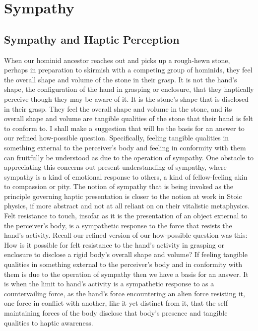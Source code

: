\chapter{Sympathy} %
\label{cha:sympathy}

\section{Sympathy and Haptic Perception} %
\label{sec:sympathy_and_haptic_perception}

When our hominid ancestor reaches out and picks up a rough-hewn stone, perhaps in preparation to skirmish with a competing group of hominids, they feel the overall shape and volume of the stone in their grasp. It is not the hand's shape, the configuration of the hand in grasping or enclosure, that they haptically perceive though they may be aware of it. It is the stone's shape that is disclosed in their grasp. They feel the overall shape and volume in the stone, and its overall shape and volume are tangible qualities of the stone that their hand is felt to conform to. I shall make a suggestion that will be the basis for an answer to our refined how-possible question. Specifically, feeling tangible qualities in something external to the perceiver's body and feeling in conformity with them can fruitfully be understood as due to the operation of sympathy. One obstacle to appreciating this concerns out present understanding of sympathy, where sympathy is a kind of emotional response to others, a kind of fellow-feeling akin to compassion or pity. The notion of sympathy that is being invoked as the principle governing haptic presentation is closer to the notion at work in Stoic physics, if more abstract and not at all reliant on on their vitalistic metaphysics. Felt resistance to touch, insofar as it is the presentation of an object external to the perceiver's body, is a sympathetic response to the force that resists the hand's activity. Recall our refined version of our how-possible question was this: How is it possible for felt resistance to the hand's activity in grasping or enclosure to disclose a rigid body's overall shape and volume? If feeling tangible qualities in something external to the perceiver's body and in conformity with them is due to the operation of sympathy then we have a basis for an answer. It is when the limit to hand's activity is a sympathetic response to as a countervailing force, as the hand's force encountering an alien force resisting it, one force in conflict with another, like it yet distinct from it, that the self maintaining forces of the body disclose that body's presence and tangible qualities to haptic awareness.

